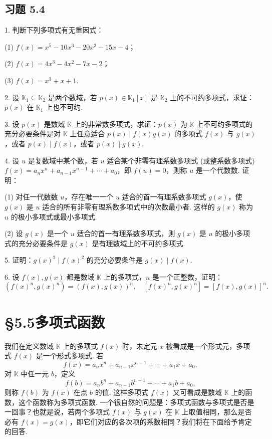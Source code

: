 \documentclass[UTF8, 12pt, fontset=fandol, oneside]{ctexart}
\begin{document}
\subsection*{习题 5.4}

1. 判断下列多项式有无重因式：

(1) $f(x)=x^5-10x^3-20x^2-15x-4$；

(2) $f(x)=4x^3-4x^2-7x-2$；

(3) $f(x)=x^3+x+1$.

2. 设 $\mathbb{K}_1\subseteq\mathbb{K}_2$ 是两个数域，若 $p(x)\in\mathbb{K}_1[x]$ 是 $\mathbb{K}_2$ 上的不可约多项式，求证：$p(x)$ 在 $\mathbb{K}_1$ 上也不可约.

3. 设 $p(x)$ 是数域 $\mathbb{K}$ 上的非常数多项式，求证：$p(x)$ 为 $\mathbb{K}$ 上不可约多项式的充分必要条件是对 $\mathbb{K}$ 上任意适合 $p(x)\mid f(x)g(x)$ 的多项式 $f(x)$ 与 $g(x)$，或者 $p(x)\mid f(x)$，或者 $p(x)\mid g(x)$.

4. 设 $u$ 是复数域中某个数，若 $u$ 适合某个非零有理系数多项式 (或整系数多项式) $f(x)=a_nx^n+a_{n-1}x^{n-1}+\cdots+a_0$，即 $f(u)=0$，则称 $u$ 是一个代数数. 证明：

(1) 对任一代数数 $u$，存在唯一一个 $u$ 适合的首一有理系数多项式 $g(x)$，使 $g(x)$ 是 $u$ 适合的所有非零有理系数多项式中的次数最小者. 这样的 $g(x)$ 称为 $u$ 的极小多项式或最小多项式.

(2) 设 $g(x)$ 是一个 $u$ 适合的首一有理系数多项式，则 $g(x)$ 是 $u$ 的极小多项式的充分必要条件是 $g(x)$ 是有理数域上的不可约多项式.

5. 证明：$g(x)^2\mid f(x)^2$ 的充分必要条件是 $g(x)\mid f(x)$.

6. 设 $f(x),g(x)$ 都是数域 $\mathbb{K}$ 上的多项式，$n$ 是一个正整数，证明：
\[
(f(x)^n,g(x)^n)=(f(x),g(x))^n,\quad [f(x)^n,g(x)^n]=[f(x),g(x)]^n.
\]

\section*{§5.5\quad 多项式函数}

我们在定义数域 $\mathbb{K}$ 上的多项式 $f(x)$ 时，未定元 $x$ 被看成是一个形式元，多项式 $f(x)$ 是一个形式多项式. 若
\[
f(x)=a_nx^n+a_{n-1}x^{n-1}+\cdots+a_1x+a_0,
\]
对 $\mathbb{K}$ 中任一元 $b$，定义
\[
f(b)=a_nb^n+a_{n-1}b^{n-1}+\cdots+a_1b+a_0,
\]
则称 $f(b)$ 为 $f(x)$ 在点 $b$ 的值. 这样多项式 $f(x)$ 又可看成是数域 $\mathbb{K}$ 上的函数，这个函数称为多项式函数. 一个很自然的问题是：多项式函数与多项式是否是一回事？也就是说，若两个多项式 $f(x)$ 与 $g(x)$ 在 $\mathbb{K}$ 上取值相同，那么是否必有 $f(x)=g(x)$，即它们对应的各次项的系数相同？我们将在下面给予肯定的回答.
\end{document}
